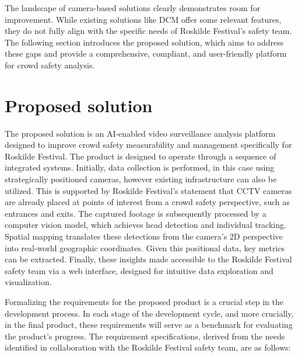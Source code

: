 The landscape of camera-based solutions clearly demonstrates room for improvement. While existing solutions like DCM offer some relevant features, they do not fully align with the specific needs of Roskilde Festival's safety team. The following section introduces the proposed solution, which aims to address these gaps and provide a comprehensive, compliant, and user-friendly platform for crowd safety analysis.

\section{Proposed solution}
\label{sec:solution}

The proposed solution is an AI-enabled video surveillance analysis platform designed to improve crowd safety measurability and management specifically for Roskilde Festival. The product is designed to operate through a sequence of integrated systems. Initially, data collection is performed, in this case using strategically positioned cameras, however existing infrastructure can also be utilized. This is supported by Roskilde Festival's statement that CCTV cameras are already placed at points of interest from a crowd safety perspective, such as entrances and exits. The captured footage is subsequently processed by a computer vision model, which achieves head detection and individual tracking. Spatial mapping translates these detections from the camera's 2D perspective into real-world geographic coordinates. Given this positional data, key metrics can be extracted. Finally, these insights  made accessible to the Roskilde Festival safety team via a web interface, designed for intuitive data exploration and visualization.

Formalizing the requirements for the proposed product is a crucial step in the development process. In each stage of the development cycle, and more crucially, in the final product, these requirements will serve as a benchmark for evaluating the product's progress. The requirement specifications, derived from the needs identified in collaboration with the Roskilde Festival safety team, are as follows:

